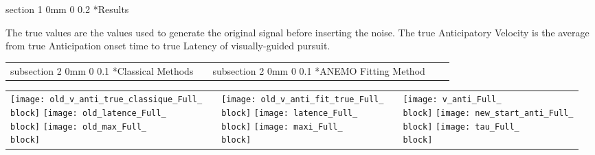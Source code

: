 \documentclass[profile,final,english, draft]{sciposter}%
\makeatletter
\renewcommand{\section}{\@startsection
        {section}%
        {1}%
        {0mm}%
        {0\baselineskip}%
        {0.2\baselineskip}%
        {\LARGE\color{red}\bfseries}}%
\renewcommand{\subsection}{\@startsection
        {subsection}%
        {2}%
        {0mm}%
        {0\baselineskip}%
        {0.1\baselineskip}%
        {\Large\color[rgb]{0.4,0,0}\bfseries}}%
\newcommand{\block}{1}
\makeatother
\begin{document}
\vspace{.1\baselineskip} %

\section*{Results}
\vspace{-.7\baselineskip}

The true values are the values used to generate the original signal before inserting the noise. The true Anticipatory Velocity is the average from true Anticipation onset time to true Latency of visually-guided pursuit.

\vspace{-0.7\baselineskip}
\begin{tabular}{p{}m{}p{}m{}p{}}
\subsection*{Classical Methods}
&&
\subsection*{ANEMO Fitting Method}
&&
\end{tabular}

\vspace{-2\baselineskip}
\begin{tabular}{m{}m{}m{}m{}m{}}
\texttt{[image: old\_v\_anti\_true\_classique\_Full\_\\block]}
\texttt{[image: old\_latence\_Full\_\\block]}
\texttt{[image: old\_max\_Full\_\\block]}
& &
\texttt{[image: old\_v\_anti\_fit\_true\_Full\_\\block]}
\texttt{[image: latence\_Full\_\\block]}
\texttt{[image: maxi\_Full\_\\block]}
& &
\texttt{[image: v\_anti\_Full\_\\block]}
\texttt{[image: new\_start\_anti\_Full\_\\block]}
\texttt{[image: tau\_Full\_\\block]}
\end{tabular}
\end{document}

